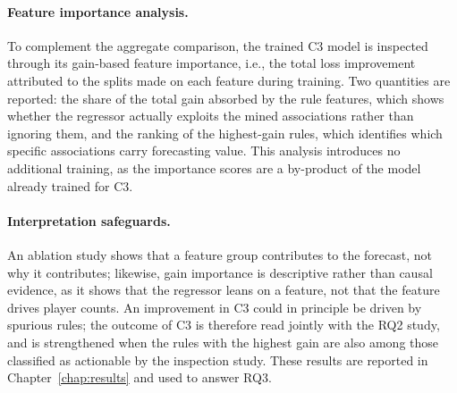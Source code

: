 \paragraph{Feature importance analysis.} To complement the aggregate comparison, the trained C3 model is inspected through its gain-based feature importance, i.e., the total loss improvement attributed to the splits made on each feature during training. Two quantities are reported: the share of the total gain absorbed by the rule features, which shows whether the regressor actually exploits the mined associations rather than ignoring them, and the ranking of the highest-gain rules, which identifies which specific associations carry forecasting value. This analysis introduces no additional training, as the importance scores are a by-product of the model already trained for C3.

\paragraph{Interpretation safeguards.} An ablation study shows that a feature group contributes to the forecast, not why it contributes; likewise, gain importance is descriptive rather than causal evidence, as it shows that the regressor leans on a feature, not that the feature drives player counts. An improvement in C3 could in principle be driven by spurious rules; the outcome of C3 is therefore read jointly with the RQ2 study, and is strengthened when the rules with the highest gain are also among those classified as actionable by the inspection study. These results are reported in Chapter~\ref{chap:results} and used to answer RQ3.
